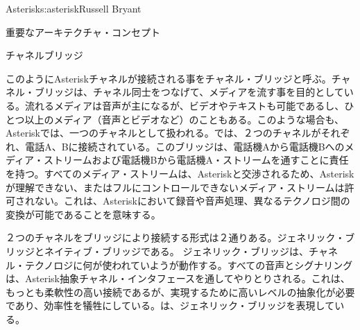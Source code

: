 \begin{aosachapter}{Asterisk}{s:asterisk}{Russell Bryant}
\begin{aosasect1}{重要なアーキテクチャ・コンセプト}
\begin{aosasect2}{チャネルブリッジ}

このようにAsteriskチャネルが接続される事をチャネル・ブリッジと呼ぶ。チャネル・ブリッジは、チャネル同士をつなげて、メディアを流す事を目的としている。流れるメディアは音声が主になるが、ビデオやテキストも可能であるし、ひとつ以上のメディア（音声とビデオなど）のこともある。このような場合も、Asteriskでは、一つのチャネルとして扱われる。では、２つのチャネルがそれぞれ、電話A、Bに接続されている。このブリッジは、電話機Aから電話機Bへのメディア・ストリームおよび電話機Bから電話機A・ストリームを通すことに責任を持つ。すべてのメディア・ストリームは、Asteriskと交渉されるため、Asteriskが理解できない、またはフルにコントロールできないメディア・ストリームは許可されない。これは、Asteriskにおいて録音や音声処理、異なるテクノロジ間の変換が可能であることを意味する。

２つのチャネルをブリッジにより接続する形式は２通りある。ジェネリック・ブリッジとネイティブ・ブリッジである。
ジェネリック・ブリッジは、チャネル・テクノロジに何が使われていようが動作する。すべての音声とシグナリングは、Asterisk抽象チャネル・インタフェースを通してやりとりされる。これは、もっとも柔軟性の高い接続であるが、実現するために高いレベルの抽象化が必要であり、効率性を犠牲にしている。は、ジェネリック・ブリッジを表現している。


\end{aosasect2}
\end{aosasect1}
\end{aosachapter}
